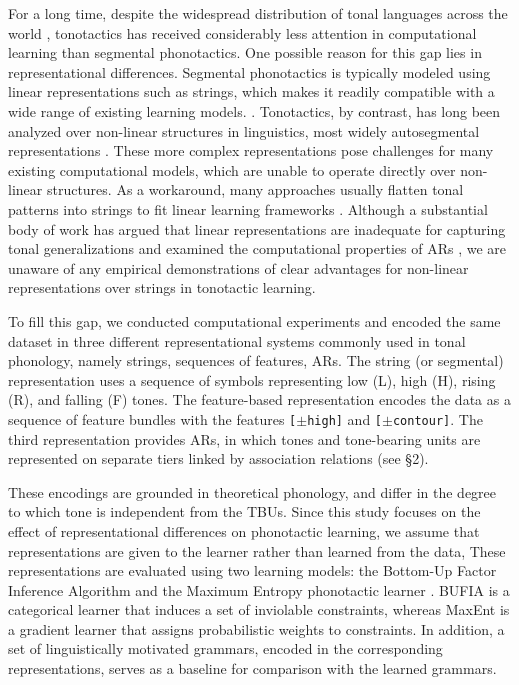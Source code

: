 \documentclass[11pt]{article}
\begin{document}
For a long time, despite the widespread distribution of tonal
languages across the world \citep{yip2002tone}, tonotactics
has received considerably less attention in computational
learning than segmental phonotactics. One possible reason
for this gap lies in representational differences.
Segmental phonotactics is typically modeled using linear
representations such as strings, which makes it readily
compatible with a wide range of existing learning models.
 \citep{CP97, hayes2008maximum,goldsmith2012information,
 mayer2020phonotactic,schrimpf2014comparing}.
Tonotactics, by contrast, has long been analyzed over
non-linear structures in linguistics, most widely autosegmental
representations \citep[ARs,][]{goldsmith1976autosegmental}.
These more complex representations pose challenges for many
existing computational models, which are unable to operate
directly over non-linear structures. As a workaround, many
approaches usually flatten tonal patterns into strings to
fit linear learning frameworks \citep{shih2013subsegmental}.
Although a substantial body of work has argued that linear
representations are inadequate for capturing tonal
generalizations \citep{clements2010autosegmental,
        oddenintroducing2013} and examined the computational
properties of ARs \citep{bird1990phonological,
        coleman1991no,kornai2007mathematical,
        jardine2015concatenation,jardine2016locality,
        jardine2017LocalNature,jardine2019expressivity},
we are unaware of any empirical demonstrations of clear
advantages for non-linear representations over strings in
tonotactic learning.

To fill this gap, we conducted computational experiments
and encoded the same dataset in three different representational 
systems commonly used in tonal phonology, %
namely strings, sequences of features, ARs.
The string (or segmental) representation uses a sequence of
symbols representing low (L), high (H), rising (R), and
falling (F) tones. The feature-based representation encodes 
the data as a sequence of feature bundles with the features 
\texttt{[\(\pm\)high]} and \texttt{[\(\pm\)contour]}. The third 
representation provides ARs, in which tones and tone-bearing units are 
represented on separate tiers linked by association relations (see \S2). 

These encodings are grounded in theoretical phonology, 
and differ in the degree to which tone is independent 
from the TBUs. Since this study focuses on the effect of 
representational differences on phonotactic learning, we 
assume that representations are given to the learner 
rather than learned from the data, These representations are 
evaluated using two learning models: the Bottom-Up Factor Inference
Algorithm \citep[BUFIA;][]{chandleeBufia2019} and the
Maximum Entropy phonotactic learner \citep[MaxEnt;][]{hayes2008maximum}.
BUFIA is a categorical learner that induces a set of
inviolable constraints, whereas MaxEnt is a gradient
learner that assigns probabilistic weights to constraints.
In addition, a set of linguistically motivated grammars,
encoded in the corresponding representations, serves as
a baseline for comparison with the learned grammars.
\end{document}
